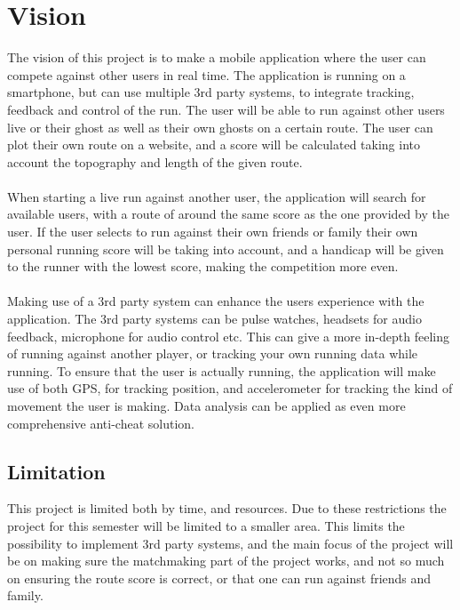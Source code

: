 \section{Vision}

The vision of this project is to make a mobile application where the user can compete against other users in real time.
The application is running on a smartphone, but can use multiple 3rd party systems, to integrate tracking, feedback and control of the run.
The user will be able to run against other users live or their ghost as well as their own ghosts on a certain route.
The user can plot their own route on a website, and a score will be calculated taking into account the topography and length of the given route. 
\\ \\
When starting a live run against another user, the application will search for available users, with a route of around the same score as the one provided by the user. If the user selects to run against their own friends or family their own personal running score will be taking into account, and a handicap will be given to the runner with the lowest score, making the competition more even.
\\ \\
Making use of a 3rd party system can enhance the users experience with the application. The 3rd party systems can be pulse watches, headsets for audio feedback, microphone for audio control etc. This can give a more in-depth feeling of running against another player, or tracking your own running data while running.
To ensure that the user is actually running, the application will make use of both GPS, for tracking position, and accelerometer for tracking the kind of movement the user is making.
Data analysis can be applied as even more comprehensive anti-cheat solution.

\subsection{Limitation}

This project is limited both by time, and resources. Due to these restrictions the project for this semester will be limited to a smaller area.
This limits the possibility to implement 3rd party systems, and the main focus of the project will be on making sure the matchmaking part of the project works, and not so much on ensuring the route score is correct, or that one can run against friends and family.
